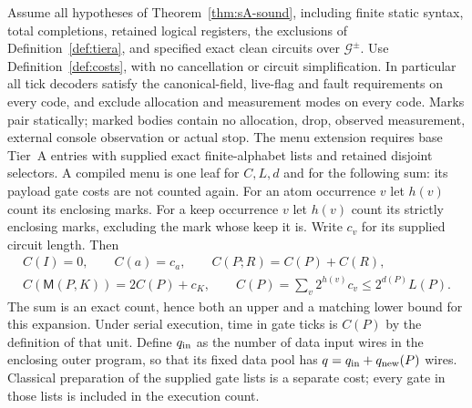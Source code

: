 \begin{theorem}
\label{thm:resA-resources}
Assume all hypotheses of Theorem~\ref{thm:sA-sound}, including finite
static syntax, total completions, retained logical registers, the
exclusions of Definition~\ref{def:tiera}, and specified exact clean
circuits over $\mathcal G^{\pm}$. Use Definition~\ref{def:costs}, with
no cancellation or circuit simplification. In particular all tick
decoders satisfy the canonical-field, live-flag and fault requirements
on every code, and exclude allocation and measurement modes on every
code. Marks pair statically; marked bodies contain no allocation, drop,
observed measurement, external console observation or actual stop.
The menu extension requires base Tier~A entries with supplied exact
finite-alphabet lists and retained disjoint selectors. A compiled menu
is one leaf for $C,L,d$ and for the following sum: its payload gate
costs are not counted again. For an atom occurrence $v$
let $h(v)$ count its enclosing marks. For a keep occurrence $v$ let
$h(v)$ count its strictly enclosing marks, excluding the mark whose
keep it is. Write $c_v$ for its supplied circuit length. Then
\[
 \begin{gathered}
 C(I)=0,\qquad C(a)=c_a,\qquad C(P;R)=C(P)+C(R),\\
 C(\mathsf M(P,K))=2C(P)+c_K,\qquad
 C(P)=\sum_v2^{h(v)}c_v\leq2^{d(P)}L(P).             \tag{RA1}
 \end{gathered}
\]
The sum is an exact count, hence both an upper and a matching lower
bound for this expansion. Under serial execution, time in gate ticks is
$C(P)$ by the definition of that unit. Define $q_{\rm in}$ as the
number of data input wires in the enclosing outer program, so that its
fixed data pool has $q=q_{\rm in}+q_{\rm new}(P)$ wires.
Classical preparation of the supplied gate lists is a separate cost;
every gate in those lists is included in the execution count.


\end{theorem}
